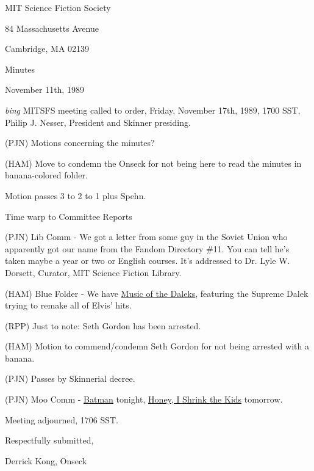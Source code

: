 \setlength{\topmargin}{-0.5in}
\setlength{\oddsidemargin}{-0.60in}
\setlength{\textheight}{9in}
\setlength{\textwidth}{6.5in}



\begin{center}
MIT Science Fiction Society

84 Massachusetts Avenue

Cambridge, MA 02139

\vspace{0.2in}
Minutes

November 11th, 1989

\end{center}
 
\vspace{0.15in}
{\em bing\/}  MITSFS meeting called to order, Friday, November 17th, 1989,
1700 SST, Philip J. Nesser, President and Skinner presiding.

(PJN) Motions concerning the minutes?

(HAM) Move to condemn the Onseck for not being here to read the
minutes in banana-colored folder.

Motion passes 3 to 2 to 1 plus Spehn.

Time warp to Committee Reports

(PJN) Lib Comm - We got a letter from some guy in the Soviet Union who
apparently got our name from the Fandom Directory \#11.  You can tell
he's taken maybe a year or two or English courses.  It's addressed to
Dr. Lyle W. Dorsett, Curator, MIT Science Fiction Library.

(HAM) Blue Folder - We have \underline{Music of the Daleks}, featuring
the Supreme Dalek trying to remake all of Elvis' hits.

(RPP) Just to note: Seth Gordon has been arrested.

(HAM) Motion to commend/condemn Seth Gordon for not being arrested
with a banana.

(PJN) Passes by Skinnerial decree.

(PJN) Moo Comm - \underline{Batman} tonight, \underline{Honey, I
Shrink the Kids} tomorrow.

Meeting adjourned, 1706 SST.

\vspace{0.15in}
\begin{center}
Respectfully submitted,

Derrick Kong, Onseck
\end{center}

